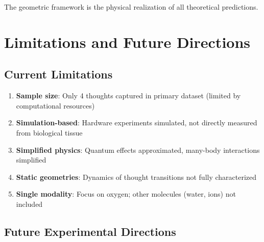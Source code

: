 \documentclass[12pt,a4paper]{article}
\begin{document}
The geometric framework is the physical realization of all theoretical predictions.

\section{Limitations and Future Directions}

\subsection{Current Limitations}

\begin{enumerate}
\item \textbf{Sample size}: Only 4 thoughts captured in primary dataset (limited by computational resources)
\item \textbf{Simulation-based}: Hardware experiments simulated, not directly measured from biological tissue
\item \textbf{Simplified physics}: Quantum effects approximated, many-body interactions simplified
\item \textbf{Static geometries}: Dynamics of thought transitions not fully characterized
\item \textbf{Single modality}: Focus on oxygen; other molecules (water, ions) not included
\end{enumerate}

\subsection{Future Experimental Directions}
\end{document}
